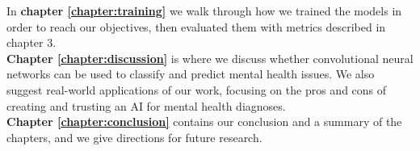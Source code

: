 \noindent In \textbf{chapter \ref{chapter:training}} we walk through how we trained the models in order to reach our objectives, then evaluated them with metrics described in chapter 3. \\

\noindent \textbf{Chapter \ref{chapter:discussion}} is where we discuss whether convolutional neural networks can be used to classify and predict mental health issues. We also suggest real-world applications of our work, focusing on the pros and cons of creating and trusting an AI for mental health diagnoses. \\

\noindent \textbf{Chapter \ref{chapter:conclusion}} contains our conclusion and a summary of the chapters, and we give directions for future research.